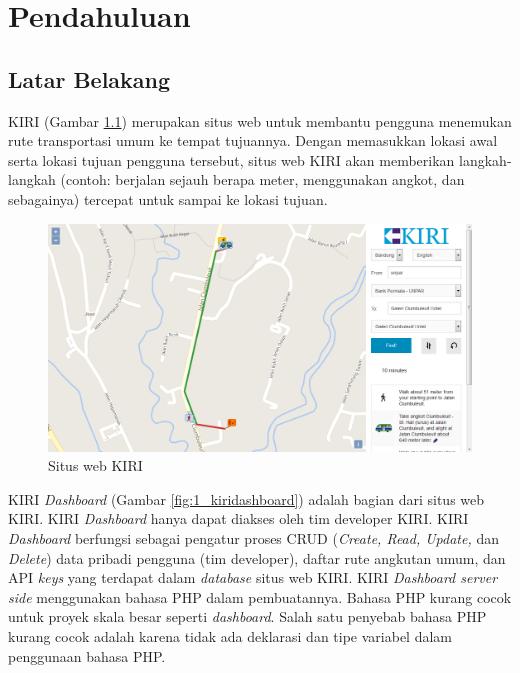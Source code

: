 \chapter{Pendahuluan}
\label{chap:pendahuluan}

\section{Latar Belakang}
\label{sec:latar_belakang}
KIRI\cite{kiritravel} (Gambar \ref{fig:1_kiritravel}) merupakan situs web untuk membantu pengguna menemukan rute transportasi umum ke tempat tujuannya. Dengan memasukkan lokasi awal serta lokasi tujuan pengguna tersebut, situs web KIRI akan memberikan langkah-langkah (contoh: berjalan sejauh berapa meter, menggunakan angkot, dan sebagainya) tercepat untuk sampai ke lokasi tujuan.

\begin{figure}[htbp]
	\centering
		\includegraphics[scale=0.35]{Gambar/1_kiritravel.png}
	\caption{Situs web KIRI\cite{kiritravel}}
	\label{fig:1_kiritravel}
\end{figure}

KIRI \textit{Dashboard}\cite{devkiritravel} (Gambar \ref{fig:1_kiridashboard}) adalah bagian dari situs web KIRI. KIRI \textit{Dashboard} hanya dapat diakses oleh tim developer KIRI. KIRI \textit{Dashboard} berfungsi sebagai pengatur proses CRUD (\textit{Create, Read, Update,} dan \textit{Delete}) data pribadi pengguna (tim developer), daftar rute angkutan umum, dan API \textit{keys} yang terdapat dalam \textit{database} situs web KIRI. KIRI \textit{Dashboard server side} menggunakan bahasa PHP dalam pembuatannya\cite{kiridashboard}. Bahasa PHP kurang cocok untuk proyek skala besar seperti \textit{dashboard}. Salah satu penyebab bahasa PHP kurang cocok adalah karena tidak ada deklarasi dan tipe variabel dalam penggunaan bahasa PHP.

